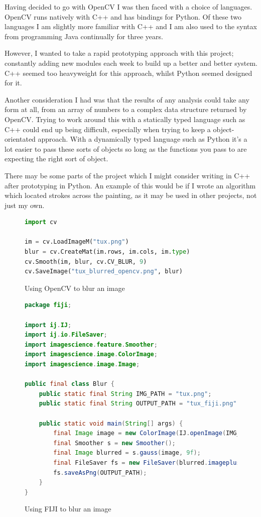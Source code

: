 \documentclass[11pt,fleqn,twoside]{article}
\begin{document}
Having decided to go with OpenCV I was then faced with a choice of languages. OpenCV runs natively
with C++ and has bindings for Python. Of these two languages I am slightly more familiar with C++ 
and I am also used to the syntax from programming Java continually for three years. 

However, I wanted to take a rapid prototyping approach with this project; constantly adding new 
modules each week to build up a better and better system. C++ seemed too heavyweight for this 
approach, whilst Python seemed designed for it.

Another consideration I had was that the results of any analysis could take any form at all, from
an array of numbers to a complex data structure returned by OpenCV. Trying to work around this with
a statically typed language such as C++ could end up being difficult, especially when trying to 
keep a object-orientated approach. With a dynamically typed language such as Python it's a lot 
easier to pass these sorts of objects so long as the functions you pass to are expecting the right 
sort of object.

There may be some parts of the project which I might consider writing in C++ after prototyping in 
Python. An example of this would be if I wrote an algorithm which located strokes across the 
painting, as it may be used in other projects, not just my own.


\begin{figure}[p]
\begin{lstlisting}[language=Python]
import cv

im = cv.LoadImageM("tux.png")
blur = cv.CreateMat(im.rows, im.cols, im.type)
cv.Smooth(im, blur, cv.CV_BLUR, 9)
cv.SaveImage("tux_blurred_opencv.png", blur)
\end{lstlisting}
\caption{Using OpenCV to blur an image}
\label{fig:opencv}
\end{figure}

\begin{figure}[p]
\begin{lstlisting}[language=Java]
package fiji;

import ij.IJ;
import ij.io.FileSaver;
import imagescience.feature.Smoother;
import imagescience.image.ColorImage;
import imagescience.image.Image;

public final class Blur {
	public static final String IMG_PATH = "tux.png";
	public static final String OUTPUT_PATH = "tux_fiji.png";

	public static void main(String[] args) {
		final Image image = new ColorImage(IJ.openImage(IMG_PATH));
		final Smoother s = new Smoother();
		final Image blurred = s.gauss(image, 9f);
		final FileSaver fs = new FileSaver(blurred.imageplus());
		fs.saveAsPng(OUTPUT_PATH);
	}
}
\end{lstlisting}
\caption{Using FIJI to blur an image}
\label{fig:fiji}
\end{figure}
\end{document}
